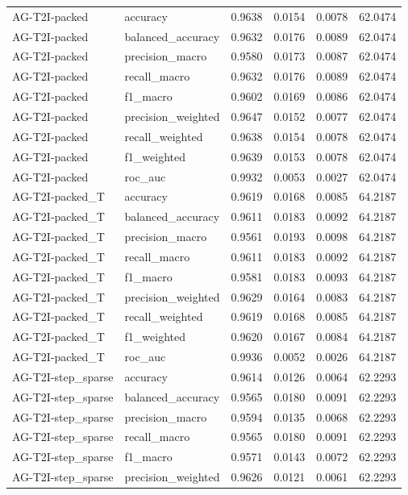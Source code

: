 \begin{tabular}{llrrrr}
AG-T2I-packed & accuracy & 0.9638 & 0.0154 & 0.0078 & 62.0474 \\
AG-T2I-packed & balanced_accuracy & 0.9632 & 0.0176 & 0.0089 & 62.0474 \\
AG-T2I-packed & precision_macro & 0.9580 & 0.0173 & 0.0087 & 62.0474 \\
AG-T2I-packed & recall_macro & 0.9632 & 0.0176 & 0.0089 & 62.0474 \\
AG-T2I-packed & f1_macro & 0.9602 & 0.0169 & 0.0086 & 62.0474 \\
AG-T2I-packed & precision_weighted & 0.9647 & 0.0152 & 0.0077 & 62.0474 \\
AG-T2I-packed & recall_weighted & 0.9638 & 0.0154 & 0.0078 & 62.0474 \\
AG-T2I-packed & f1_weighted & 0.9639 & 0.0153 & 0.0078 & 62.0474 \\
AG-T2I-packed & roc_auc & 0.9932 & 0.0053 & 0.0027 & 62.0474 \\
AG-T2I-packed_T & accuracy & 0.9619 & 0.0168 & 0.0085 & 64.2187 \\
AG-T2I-packed_T & balanced_accuracy & 0.9611 & 0.0183 & 0.0092 & 64.2187 \\
AG-T2I-packed_T & precision_macro & 0.9561 & 0.0193 & 0.0098 & 64.2187 \\
AG-T2I-packed_T & recall_macro & 0.9611 & 0.0183 & 0.0092 & 64.2187 \\
AG-T2I-packed_T & f1_macro & 0.9581 & 0.0183 & 0.0093 & 64.2187 \\
AG-T2I-packed_T & precision_weighted & 0.9629 & 0.0164 & 0.0083 & 64.2187 \\
AG-T2I-packed_T & recall_weighted & 0.9619 & 0.0168 & 0.0085 & 64.2187 \\
AG-T2I-packed_T & f1_weighted & 0.9620 & 0.0167 & 0.0084 & 64.2187 \\
AG-T2I-packed_T & roc_auc & 0.9936 & 0.0052 & 0.0026 & 64.2187 \\
AG-T2I-step_sparse & accuracy & 0.9614 & 0.0126 & 0.0064 & 62.2293 \\
AG-T2I-step_sparse & balanced_accuracy & 0.9565 & 0.0180 & 0.0091 & 62.2293 \\
AG-T2I-step_sparse & precision_macro & 0.9594 & 0.0135 & 0.0068 & 62.2293 \\
AG-T2I-step_sparse & recall_macro & 0.9565 & 0.0180 & 0.0091 & 62.2293 \\
AG-T2I-step_sparse & f1_macro & 0.9571 & 0.0143 & 0.0072 & 62.2293 \\
AG-T2I-step_sparse & precision_weighted & 0.9626 & 0.0121 & 0.0061 & 62.2293 \\

\end{tabular}
